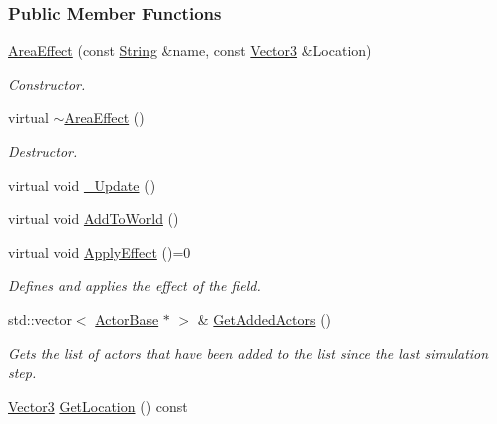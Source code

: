 \subsubsection*{Public Member Functions}
\begin{DoxyCompactItemize}
\item 
\hyperlink{classMezzanine_1_1AreaEffect_a58cc7fb0725297113bbc32d619e57705}{AreaEffect} (const \hyperlink{namespaceMezzanine_acf9fcc130e6ebf08e3d8491aebcf1c86}{String} \&name, const \hyperlink{classMezzanine_1_1Vector3}{Vector3} \&Location)
\begin{DoxyCompactList}\small\item\em Constructor. \item\end{DoxyCompactList}\item 
virtual \hyperlink{classMezzanine_1_1AreaEffect_a1e825ce1dcb2d78c190b17d7bff7306c}{$\sim$AreaEffect} ()
\begin{DoxyCompactList}\small\item\em Destructor. \item\end{DoxyCompactList}\item 
virtual void \hyperlink{classMezzanine_1_1AreaEffect_aa852e811bf900d209be137901f7e536c}{\_\-Update} ()
\item 
virtual void \hyperlink{classMezzanine_1_1AreaEffect_aed1323d5e951b5c02c789b4d30d6d9d7}{AddToWorld} ()
\item 
virtual void \hyperlink{classMezzanine_1_1AreaEffect_a988cd958e49d65331a059951af3c2884}{ApplyEffect} ()=0
\begin{DoxyCompactList}\small\item\em Defines and applies the effect of the field. \item\end{DoxyCompactList}\item 
std::vector$<$ \hyperlink{classMezzanine_1_1ActorBase}{ActorBase} $\ast$ $>$ \& \hyperlink{classMezzanine_1_1AreaEffect_ac349f091e923cbb92740aaa35f2f5c2e}{GetAddedActors} ()
\begin{DoxyCompactList}\small\item\em Gets the list of actors that have been added to the list since the last simulation step. \item\end{DoxyCompactList}\item 
\hyperlink{classMezzanine_1_1Vector3}{Vector3} \hyperlink{classMezzanine_1_1AreaEffect_a37d04f8e6d6e8451348ee60fd083968b}{GetLocation} () const 

\end{DoxyCompactItemize}
